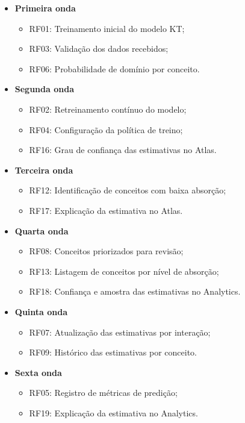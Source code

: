 \begin{itemize}
    \item \textbf{Primeira onda}
    \begin{itemize}
        \item RF01: Treinamento inicial do modelo KT;
        \item RF03: Validação dos dados recebidos;
        \item RF06: Probabilidade de domínio por conceito.
    \end{itemize}
    \item \textbf{Segunda onda}
    \begin{itemize}
        \item RF02: Retreinamento contínuo do modelo;
        \item RF04: Configuração da política de treino;
        \item RF16: Grau de confiança das estimativas no Atlas.
    \end{itemize}
    \item \textbf{Terceira onda}
    \begin{itemize}
        \item RF12: Identificação de conceitos com baixa absorção;
        \item RF17: Explicação da estimativa no Atlas.
    \end{itemize}
    \item \textbf{Quarta onda}
    \begin{itemize}
        \item RF08: Conceitos priorizados para revisão;
        \item RF13: Listagem de conceitos por nível de absorção;
        \item RF18: Confiança e amostra das estimativas no Analytics.
    \end{itemize}
    \item \textbf{Quinta onda}
    \begin{itemize}
        \item RF07: Atualização das estimativas por interação;
        \item RF09: Histórico das estimativas por conceito.
    \end{itemize}
    \item \textbf{Sexta onda}
    \begin{itemize}
        \item RF05: Registro de métricas de predição;
        \item RF19: Explicação da estimativa no Analytics.

\end{itemize}
\end{itemize}
